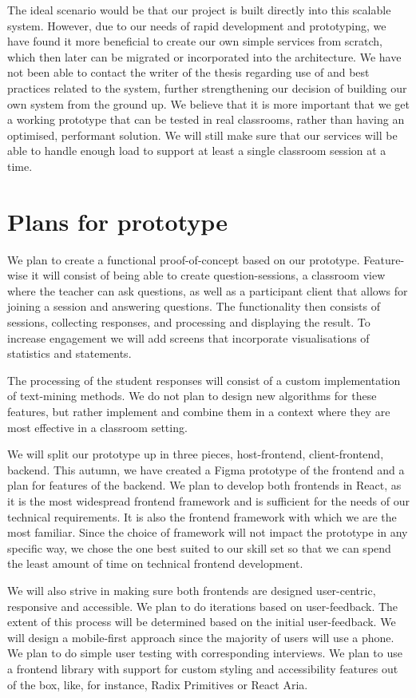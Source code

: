 The ideal scenario would be that our project is built directly into this scalable system. However, due to our needs of rapid development and prototyping, we have found it more beneficial to create our own simple services from scratch, which then later can be migrated or incorporated into the architecture. We have not been able to contact the writer of the thesis regarding use of and best practices related to the system, further strengthening our decision of building our own system from the ground up. We believe that it is more important that we get a working prototype that can be tested in real classrooms, rather than having an optimised, performant solution. We will still make sure that our services will be able to handle enough load to support at least a single classroom session at a time.

\section{Plans for prototype}
We plan to create a functional proof-of-concept based on our prototype. Feature-wise it will consist of being able to create question-sessions, a classroom view where the teacher can ask questions, as well as a participant client that allows for joining a session and answering questions. The functionality then consists of sessions, collecting responses, and processing and displaying the result. To increase engagement we will add screens that incorporate visualisations of statistics and statements.

The processing of the student responses will consist of a custom implementation of text-mining methods. We do not plan to design new algorithms for these features, but rather implement and combine them in a context where they are most effective in a classroom setting. 

We will split our prototype up in three pieces, host-frontend, client-frontend, backend. This autumn, we have created a Figma prototype of the frontend and a plan for features of the backend. We plan to develop both frontends in React, as it is the most widespread frontend framework and is sufficient for the needs of our technical requirements. It is also the frontend framework with which we are the most familiar. Since the choice of framework will not impact the prototype in any specific way, we chose the one best suited to our skill set so that we can spend the least amount of time on technical frontend development.

We will also strive in making sure both frontends are designed user-centric, responsive and accessible. We plan to do iterations based on user-feedback. The extent of this process will be determined based on the initial user-feedback. We will design a mobile-first approach since the majority of users will use a phone. We plan to do simple user testing with corresponding interviews. We plan to use a frontend library with support for custom styling and accessibility features out of the box, like, for instance, Radix Primitives or React Aria.


